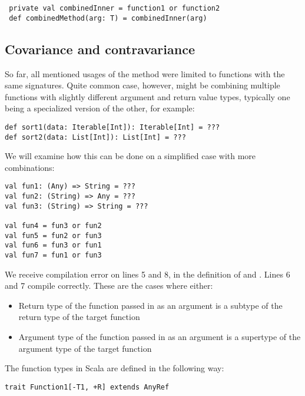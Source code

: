  \lstset{style=Scala}
 \begin{lstlisting}
 private val combinedInner = function1 or function2
 def combinedMethod(arg: T) = combinedInner(arg)
 \end{lstlisting}

\subsection{Covariance and contravariance}
\label{subsec:covariance_contravariance}

So far, all mentioned usages of the  method were limited to functions with the same signatures. Quite common case, however, might be combining multiple functions with slightly different argument and return value types, typically one being a specialized version of the other, for example:

\lstset{style=Scala}
\begin{lstlisting}
def sort1(data: Iterable[Int]): Iterable[Int] = ???
def sort2(data: List[Int]): List[Int] = ???
\end{lstlisting}

We will examine how this can be done on a simplified case with more combinations:

\lstset{style=Scala}
\begin{lstlisting}
val fun1: (Any) => String = ???
val fun2: (String) => Any = ???
val fun3: (String) => String = ???

val fun4 = fun3 or fun2
val fun5 = fun2 or fun3
val fun6 = fun3 or fun1
val fun7 = fun1 or fun3
\end{lstlisting}

We receive compilation error on lines 5 and 8, in the definition of  and . Lines 6 and 7 compile correctly. These are the cases where either:

\begin{itemize}
	\item Return type of the function passed in as an argument is a subtype of the return type of the target function
	\item Argument type of the function passed in as an argument is a supertype of the argument type of the target function
\end{itemize}

The function types in Scala are defined in the following way:
\lstset{style=Scala}
\begin{lstlisting}
trait Function1[-T1, +R] extends AnyRef
\end{lstlisting}

